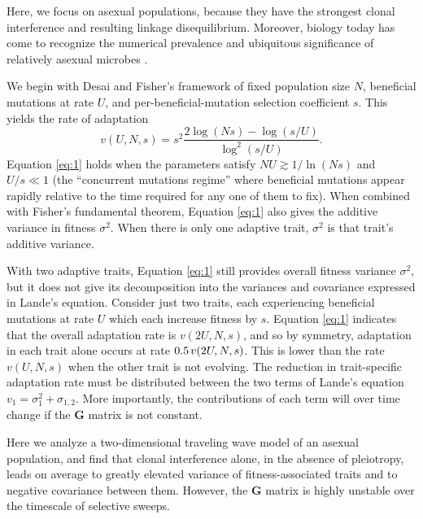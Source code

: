 \documentclass[9pt,twocolumn,twoside]{gsajnl}
\newcommand{\G}{\textbf{G }}
\begin{document}
% 
% 
% 
%

Here, we focus on asexual populations, because they have the strongest clonal interference and resulting linkage disequilibrium. Moreover, biology today has come to recognize the numerical prevalence and ubiquitous significance of relatively asexual microbes \citep{mcfall2013animals}.

We begin with Desai and Fisher's \citep{desai2007beneficial} framework of fixed population size $N$, beneficial mutations at rate $U$, and per-beneficial-mutation selection coefficient $s$. This yields the rate of adaptation \citep[Equation 41]{desai2007beneficial}
\begin{equation}\label{eq:1}
v(U,N,s) = s^2\frac{2\log(N s)-\log(s/U)}{\log^2(s/U)}.
\end{equation}
Equation \ref{eq:1} holds when the parameters satisfy $NU \gtrsim 1/\ln(Ns)$ and $U/s \ll 1$ (the ``concurrent mutations regime''  where beneficial mutations appear rapidly relative to the time required for any one of them to fix). When combined with Fisher's fundamental theorem, Equation \eqref{eq:1} also gives the additive variance in fitness $\sigma^2$. When there is only one adaptive trait, $\sigma^2$ is that trait's additive variance. 

With two adaptive traits, Equation \eqref{eq:1} still provides overall fitness variance $\sigma^2$, but it does not give its decomposition into the variances and covariance expressed in Lande's equation. Consider just two traits, each experiencing beneficial mutations at rate $U$ which each increase fitness by $s$. Equation \ref{eq:1} indicates that the overall adaptation rate is $v(2U,N,s)$, and so by symmetry, adaptation in each trait alone occurs at rate $0.5 \hspace{.02 in} v(2U,N,s)$. This is lower than the rate $v(U,N,s)$ when the other trait is not evolving. The reduction in trait-specific adaptation rate must be distributed between the two terms of Lande's equation $v_1 =\sigma_1^2 +\sigma_{1,2}$. More importantly, the contributions of each term will over time change if the \G matrix is not constant.

Here we analyze a two-dimensional traveling wave model of an asexual population, and find that clonal interference alone, in the absence of pleiotropy, leads on average to greatly elevated variance of fitness-associated traits and to negative covariance between them.  However, the \G matrix is highly unstable over the timescale of selective sweeps.
\end{document}
